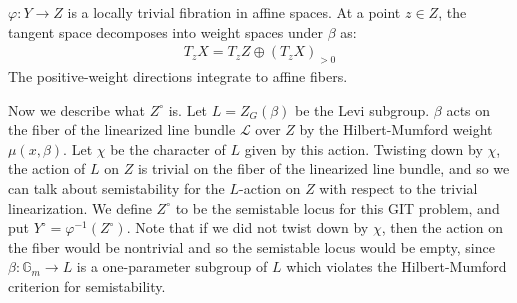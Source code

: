 \documentclass[12pt]{article}
\begin{document}
\begin{proposition}
    $\varphi : Y \to Z$ is a locally trivial fibration in affine spaces. At a point $z\in Z$, the tangent space decomposes into weight spaces under $\beta$ as:
\begin{align*}
    T_zX = T_zZ \oplus (T_zX)_{>0}
\end{align*}
The positive-weight directions integrate to affine fibers.
\end{proposition}

Now we describe what $Z^\circ$ is. Let $L = Z_G(\beta)$
be the Levi subgroup. $\beta$ acts on the fiber of the linearized line bundle $\mathcal L$ over $Z$ by the Hilbert-Mumford weight $\mu(x,\beta)$. Let $\chi$ be the character of $L$ given by this action. Twisting down by $\chi$, the action of $L$ on $Z$ is trivial on the fiber of the linearized line bundle, and so we can talk about semistability for the $L$-action on $Z$ with respect to the trivial linearization. We define $Z^\circ$ to be the semistable locus for this GIT problem, and put $Y^\circ = \varphi^{-1}(Z^\circ)$. Note that if we did not twist down by $\chi$, then the action on the fiber would be nontrivial and so the semistable locus would be empty, since $\beta: \mathbb G_m \to L$ is a one-parameter subgroup of $L$ which violates the Hilbert-Mumford criterion for semistability.
\end{document}
